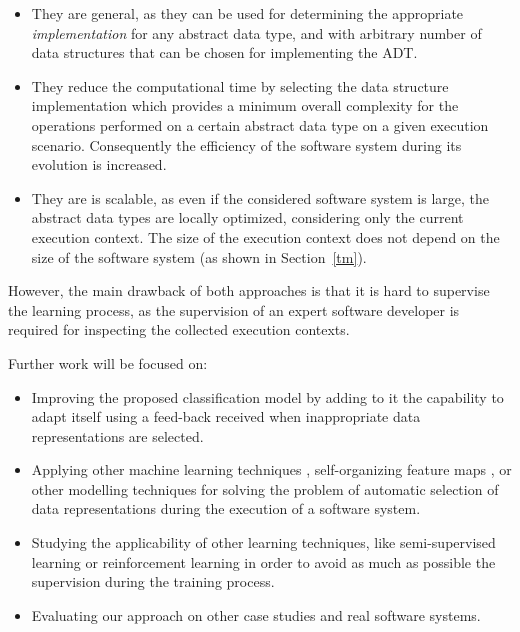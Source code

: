 \begin{itemize}

\item They are general, as they can be used for determining the appropriate \emph{implementation} for any abstract data type, and with arbitrary number of data structures that can be chosen for implementing the ADT.

\item They reduce the computational time by selecting the data structure implementation which provides a minimum overall complexity for the operations performed on a certain abstract data type on a given execution scenario. Consequently the efficiency of the software system during its evolution is increased.

\item They are is scalable, as even if the considered software system is large, the abstract data types are locally optimized, considering only the current execution context. The size of the execution context does not depend on the size of the software system (as shown in Section~\ref{tm}).

\end{itemize}

However, the main drawback of both approaches is that it is hard to supervise the learning process, as the supervision of an expert software developer is required for inspecting the collected execution contexts.

Further work will be focused on:

\begin{itemize}

\item Improving the proposed classification model by adding to it the capability to adapt itself using a feed-back received when inappropriate data representations are selected.

\item Applying other machine learning techniques  \cite{tezel,zhu} , self-organizing feature maps  \cite{koh}, or other modelling techniques  \cite{raykar,nguyen,takacs}   for solving the problem of automatic selection of data representations during the execution of a software system.

\item Studying the applicability of other learning techniques, like semi-supervised learning \cite{zhou} or reinforcement learning  \cite{sutton} in order to avoid as much as possible the supervision during the training process.

\item Evaluating our approach on other case studies and real software systems.

\end{itemize}

